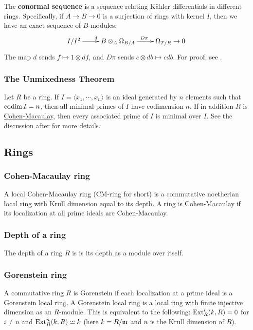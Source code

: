 \documentclass[11pt, english]{article}
\begin{document}
The \textbf{conormal sequence} is a sequence relating Kähler differentials in different rings. Specifically, if $A \to B \to 0$ is a surjection of rings with kernel $I$, then we have an exact sequence of $B$-modules:
\[
\xymatrix{
I/I^2 \ar[r]^d & B \otimes_A \Omega_{B/A} \ar[r]^{D\pi} & \Omega_{T/R} \to 0
}
\]
The map $d$ sends $f \mapsto 1 \otimes df$, and $D \pi$ sends $c \otimes db \mapsto c db$. For proof, see \cite[Chapter 16]{eisenbud}.

\subsubsection{The Unmixedness Theorem}
Let $R$ be a ring. If $I=\langle x_1,\cdots,x_n\rangle $ is an ideal generated by $n$ elements such that $\operatorname{codim} I=n$, then all minimal primes of $I$ have codimension $n$. If in addition $R$ is \hyperref[cmring]{Cohen-Macaulay}, then every associated prime of $I$ is minimal over $I$. See the discussion after \cite[Corollary 18.14]{eisenbud} for more details. 

\subsection{Rings}
\subsubsection{Cohen-Macaulay ring}
\label{cmring}
A local Cohen-Macaulay ring (CM-ring for short) is a commutative noetherian local ring with Krull dimension equal to its depth. A ring is Cohen-Macaulay if its localization at all prime ideals are Cohen-Macaulay.

\subsubsection{Depth of a ring}

The depth of a ring $R$ is is its depth as a module over itself.

\subsubsection{Gorenstein ring}

A commutative ring $R$ is Gorenstein if each localization at a prime ideal is a Gorenstein local ring. A Gorenstein local ring is a local ring with finite injective dimension as an $R$-module. This is equivalent to the following: $\operatorname{\mathrm{Ext}}_R^i(k,R)=0$ for $i \neq n$ and $\operatorname{\mathrm{Ext}}_R^n(k,R) \simeq k$ (here $k = R/\mathfrak{m}$ and $n$ is the Krull dimension of $R$).
\end{document}
